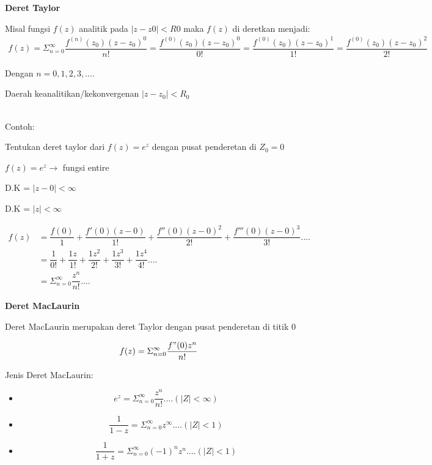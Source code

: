 \documentclass{article}
\begin{document}
\textbf{Deret Taylor}

Misal fungsi $f(z)$ analitik pada $|z-z0| < R0$ maka $f(z)$ di deretkan menjadi:
\begin{align}
    f(z) = \Sigma_{n=0}^{\infty}\dfrac{f^{(n)}{(z_0)(z-z_0)^0}}{n!}=\dfrac{f^{(0)}{(z_0)(z-z_0)^0}}{0!}=\dfrac{f^{(0)}{(z_0)(z-z_0)^1}}{1!}=\dfrac{f^{(0)}{(z_0)(z-z_0)^2}}{2!} \nonumber
\end{align}

Dengan $n = 0, 1, 2, 3, ....$

Daerah keanalitikan/kekonvergenan $|z-z_0| < R_0$

\leavevmode\\

Contoh:

Tentukan deret taylor dari $f(z) = e^z$ dengan pusat penderetan di $Z_0 = 0$

$f(z) = e^z \rightarrow$  fungsi entire

D.K = $|z-0|<\infty$

D.K = $|z|<\infty$

\begin{align}
    f(z) & = \dfrac{f(0)}{1} + \dfrac{f'{(0)(z-0)}}{1!} + \dfrac{f''{(0)(z-0)^2}}{2!} + \dfrac{f'''{(0)(z-0)^3}}{3!}....
    \nonumber                                                                                                            \\
         & = \dfrac{1}{0!} + \dfrac{1z}{1!} + \dfrac{1z^2}{2!} + \dfrac{1z^3}{3!} + \dfrac{1z^4}{4!}....
    \nonumber                                                                                                            \\
         & = \Sigma_{n=0}^{\infty} \dfrac{z^n}{n!}....
    \nonumber
\end{align}

\textbf{Deret MacLaurin}

Deret MacLaurin merupakan deret Taylor dengan pusat penderetan di titik 0

\begin{align}
    f(z) = \Sigma_{n=0}^{\infty} \dfrac{f"(0)z^n}{n!}
    \nonumber
\end{align}

Jenis Deret MacLaurin:
\begin{itemize}
    \item   \begin{equation}
              e^z = \Sigma_{n=0}^{\infty} \dfrac{z^n}{n!}....(|Z|<\infty)
              \nonumber
          \end{equation}
    \item   \begin{equation}
              \dfrac{1}{1-z} = \Sigma_{n=0}^{\infty} z^{\infty}....(|Z|<1)
              \nonumber
          \end{equation}
    \item   \begin{equation}
              \dfrac{1}{1+z} = \Sigma_{n=0}^{\infty} (-1)^n z^n....(|Z|<1)
              \nonumber
          \end{equation}
\end{itemize}
\end{document}
